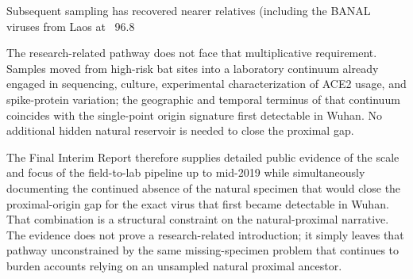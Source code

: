 Subsequent sampling has recovered nearer relatives (including the BANAL viruses from Laos at ~96.8%

The research-related pathway does not face that multiplicative requirement. Samples moved from high-risk bat sites into a laboratory continuum already engaged in sequencing, culture, experimental characterization of ACE2 usage, and spike-protein variation; the geographic and temporal terminus of that continuum coincides with the single-point origin signature first detectable in Wuhan. No additional hidden natural reservoir is needed to close the proximal gap.

The Final Interim Report therefore supplies detailed public evidence of the scale and focus of the field-to-lab pipeline up to mid-2019 while simultaneously documenting the continued absence of the natural specimen that would close the proximal-origin gap for the exact virus that first became detectable in Wuhan. That combination is a structural constraint on the natural-proximal narrative. The evidence does not prove a research-related introduction; it simply leaves that pathway unconstrained by the same missing-specimen problem that continues to burden accounts relying on an unsampled natural proximal ancestor.
